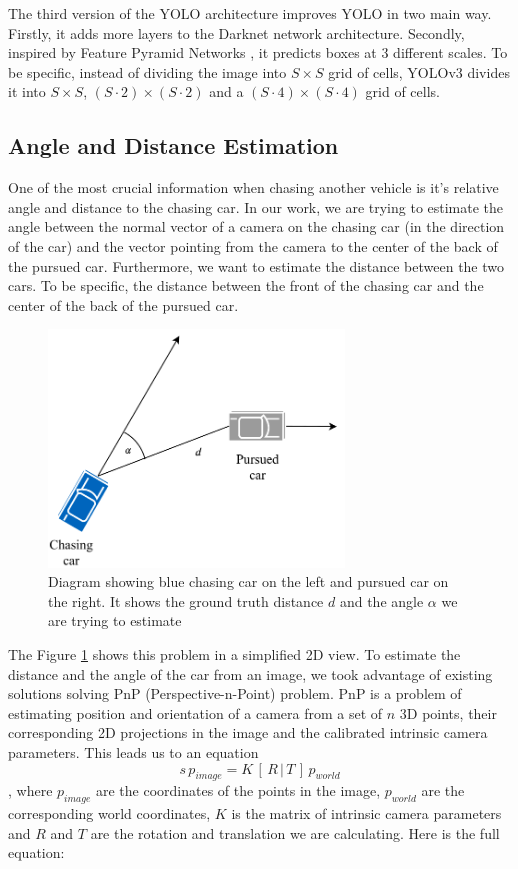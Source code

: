 The third version of the YOLO architecture improves YOLO in two main way. Firstly, it adds more layers to the Darknet network architecture. Secondly, inspired by Feature Pyramid Networks \cite{FPN}, it predicts boxes at 3 different scales. To be specific, instead of dividing the image into $S\times S$ grid of cells, YOLOv3 divides it into $S\times S$, $(S\cdot2)\times (S\cdot2)$ and a $(S\cdot4)\times (S\cdot4)$ grid of cells.


\subsection{Angle and Distance Estimation}
One of the most crucial information when chasing another vehicle is it's relative angle and distance to the chasing car. In our work, we are trying to estimate the angle between the normal vector of a camera on the chasing car (in the direction of the car) and the vector pointing from the camera to the center of the back of the pursued car. Furthermore, we want to estimate the distance between the two cars. To be specific, the distance between the front of the chasing car and the center of the back of the pursued car.

\begin{figure}[h!]
    \centering
    \includegraphics[width=0.7\textwidth]{images/chasing_diagram.pdf}
    
    \caption{Diagram showing blue chasing car on the left and pursued car on the right. It shows the ground truth distance $d$ and the angle $\alpha$ we are trying to estimate }\label{f:chasing_diagram}
\end{figure}

The Figure \ref{f:chasing_diagram} shows this problem in a simplified 2D view. To estimate the distance and the angle of the car from an image, we took advantage of existing solutions solving PnP (Perspective-n-Point) problem. PnP is a problem of estimating position and orientation of a camera from a set of $n$ 3D points, their corresponding 2D projections in the image and the calibrated intrinsic camera parameters. This leads us to an equation 
\begin{equation}
s\,p_{image} = K\,[\,R\, |\, T\, ]\, p_{world}
\end{equation}
, where $p_{image}$
are the coordinates of the points in the image, $p_{world}$ are the corresponding world coordinates, $K$ is the matrix of intrinsic camera parameters and $R$ and $T$ are the rotation and translation we are calculating. Here is the full equation: 


